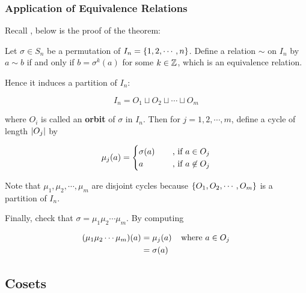 \documentclass[a4paper,12pt]{article}
\begin{document}
\subsubsection{Application of Equivalence Relations}
Recall \rthm[\sctr{20}], below is the proof of the theorem:\n

\begin{prv}
  Let $\sigma\in S_{n}$ be a permutation of $I_{n}=\left\{ 1,2,\cdots,n\right\}$. Define a relation $\sim$ on $I_{n}$ by $a\sim b$ if and only if $b=\sigma^{k}(a)$ for some $k\in\mathbb{Z}$, which is an equivalence relation.\n

  Hence it induces a partition of $I_{n}$:

  $$I_{n}=O_{1}\sqcup O_{2}\sqcup\cdots\sqcup O_{m}$$\s

  where $O_{i}$ is called an \textbf{orbit} of $\sigma$ in $I_{n}$. Then for $j=1,2,\cdots,m$, define a cycle of length $\left| O_{j}\right|$ by

  $$\mu_{j}(a)=\begin{cases}
    \sigma(a)&\;\;\;\;\text{, if }a\in O_{j}\\
    a&\;\;\;\;\text{, if }a\not\in O_{j}
  \end{cases}$$\s

  Note that $\mu_{1},\mu_{2},\cdots,\mu_{m}$ are disjoint cycles because $\left\{ O_{1},O_{2},\cdots,O_{m}\right\}$ is a partition of $I_{n}$.\n

  Finally, check that $\sigma=\mu_{1}\mu_{2}\cdots\mu_{m}$. By computing

  $$\begin{aligned}[t]
    (\mu_{1}\mu_{2}\cdots\mu_{m})(a)&=\mu_{j}(a)\;\;\;\;\text{where }a\in O_{j}\\
    &=\sigma(a)
  \end{aligned}$$
\end{prv}

\subsection{Cosets}
\end{document}
